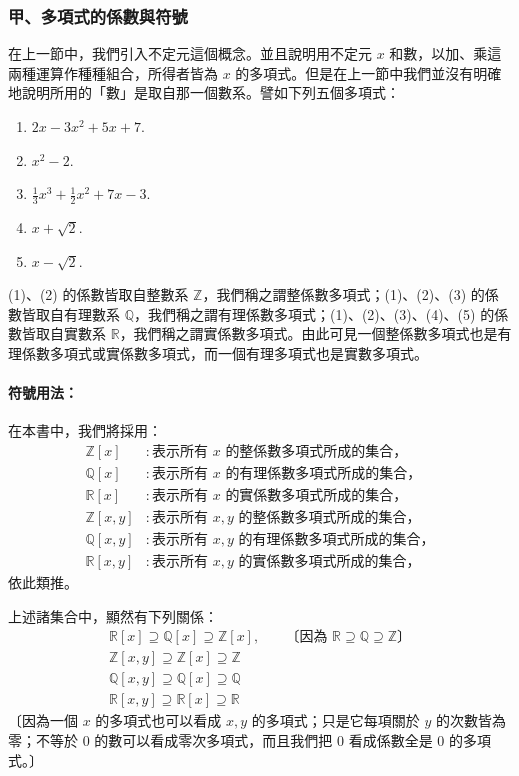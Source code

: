 \subsubsection*{甲、多項式的係數與符號}\label{subsec:5-2-a}

在上一節中，我們引入不定元這個概念。並且說明用不定元 $x$ 和數，以加、乘這兩種運算作種種組合，所得者皆為 $x$ 的多項式。但是在上一節中我們並沒有明確地說明所用的「數」是取自那一個數系。譬如下列五個多項式：
\begin{enumerate}[(1)]
  \item $2x-3x^2+5x+7$.
  \item $x^2-2$.
  \item $\frac{1}{3}x^3+\frac{1}{2}x^2+7x-3$.
  \item $x+\sqrt{2}$.
  \item $x-\sqrt{2}$.
\end{enumerate}
(1)、(2) 的係數皆取自整數系 $\mathbb{Z}$，我們稱之謂整係數多項式；(1)、(2)、(3) 的係數皆取自有理數系 $\mathbb{Q}$，我們稱之謂有理係數多項式；(1)、(2)、(3)、(4)、(5) 的係數皆取自實數系 $\mathbb{R}$，我們稱之謂實係數多項式。由此可見一個整係數多項式也是有理係數多項式或實係數多項式，而一個有理多項式也是實數多項式。

\paragraph{符號用法：}
在本書中，我們將採用：
\begin{align*}
  \mathbb{Z}[x] &: \text{表示所有 $x$ 的整係數多項式所成的集合，} \\
  \mathbb{Q}[x] &: \text{表示所有 $x$ 的有理係數多項式所成的集合，} \\
  \mathbb{R}[x] &: \text{表示所有 $x$ 的實係數多項式所成的集合，} \\
  \mathbb{Z}[x,y] &: \text{表示所有 $x, y$ 的整係數多項式所成的集合，} \\
  \mathbb{Q}[x,y] &: \text{表示所有 $x, y$ 的有理係數多項式所成的集合，} \\
  \mathbb{R}[x,y] &: \text{表示所有 $x, y$ 的實係數多項式所成的集合，}
\end{align*}
依此類推。

上述諸集合中，顯然有下列關係：
\begin{align*}
  \mathbb{R}[x] \supseteq \mathbb{Q}[x] \supseteq \mathbb{Z}[x], \quad &\text{〔因為 $\mathbb{R} \supseteq \mathbb{Q} \supseteq \mathbb{Z}$〕} \\
  \mathbb{Z}[x,y] \supseteq \mathbb{Z}[x] \supseteq \mathbb{Z} \\
  \mathbb{Q}[x,y] \supseteq \mathbb{Q}[x] \supseteq \mathbb{Q} \\
  \mathbb{R}[x,y] \supseteq \mathbb{R}[x] \supseteq \mathbb{R}
\end{align*}
〔因為一個 $x$ 的多項式也可以看成 $x, y$ 的多項式；只是它每項關於 $y$ 的次數皆為零；不等於 $0$ 的數可以看成零次多項式，而且我們把 $0$ 看成係數全是 $0$ 的多項式。〕

